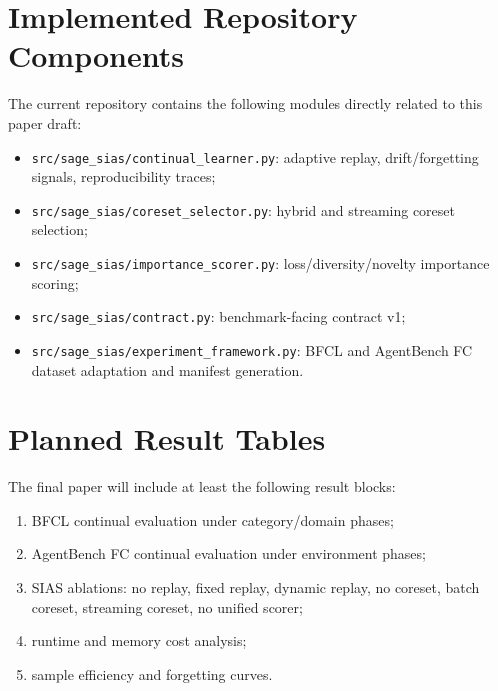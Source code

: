 \documentclass{article}
\begin{document}
\section{Implemented Repository Components}

The current repository contains the following modules directly related to this paper draft:
\begin{itemize}[leftmargin=12pt]
    \item \texttt{src/sage\_sias/continual\_learner.py}: adaptive replay, drift/forgetting signals, reproducibility traces;
    \item \texttt{src/sage\_sias/coreset\_selector.py}: hybrid and streaming coreset selection;
    \item \texttt{src/sage\_sias/importance\_scorer.py}: loss/diversity/novelty importance scoring;
    \item \texttt{src/sage\_sias/contract.py}: benchmark-facing contract v1;
    \item \texttt{src/sage\_sias/experiment\_framework.py}: BFCL and AgentBench FC dataset adaptation and manifest generation.
\end{itemize}

\section{Planned Result Tables}

The final paper will include at least the following result blocks:
\begin{enumerate}[leftmargin=14pt]
    \item BFCL continual evaluation under category/domain phases;
    \item AgentBench FC continual evaluation under environment phases;
    \item SIAS ablations: no replay, fixed replay, dynamic replay, no coreset, batch coreset, streaming coreset, no unified scorer;
    \item runtime and memory cost analysis;
    \item sample efficiency and forgetting curves.
\end{enumerate}
\end{document}
